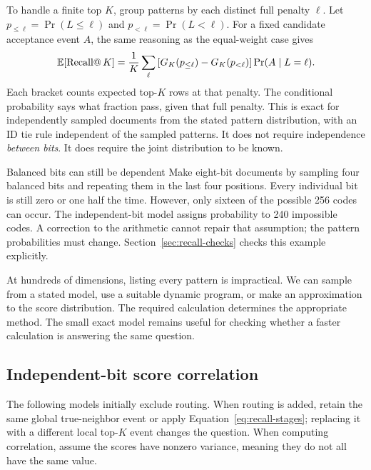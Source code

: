 To handle a finite top $K$, group patterns by each distinct full penalty $\ell$. Let
$p_{\le\ell}=\Pr(L\le\ell)$ and $p_{<\ell}=\Pr(L<\ell)$. For a fixed candidate acceptance event
$A$, the same reasoning as the equal-weight case gives
\begin{equation}
\mathbb E[\operatorname{Recall@}K]
=\frac1K\sum_{\ell}
 \left[G_K(p_{\le\ell})-G_K(p_{<\ell})\right]\Pr(A\mid L=\ell).
\label{eq:weighted-finite-recall}
\end{equation}
Each bracket counts expected top-$K$ rows at that penalty. The conditional probability says
what fraction pass, given that full penalty. This is exact for independently sampled documents from the stated pattern
distribution, with an ID tie rule independent of the sampled patterns. It does not require
independence \emph{between bits}. It does require the joint distribution to be known.

\begin{examplebox}{Balanced bits can still be dependent}
Make eight-bit documents by sampling four balanced bits and repeating them in the last four
positions. Every individual bit is still zero or one half the time. However, only sixteen
of the possible 256 codes can occur. The independent-bit model assigns probability to 240
impossible codes. A correction to the arithmetic cannot repair that assumption; the pattern
probabilities must change. Section~\ref{sec:recall-checks} checks this example explicitly.
\end{examplebox}

At hundreds of dimensions, listing every pattern is impractical. We can sample from a stated
model, use a suitable dynamic program, or make an approximation to the score distribution.
The required calculation determines the appropriate method. The small exact model remains useful for
checking whether a faster calculation is answering the same question.

\subsection{Independent-bit score correlation}
The following models initially exclude routing. When routing is added, retain the same global true-neighbor event or apply Equation~\eqref{eq:recall-stages}; replacing it with a different local top-$K$ event changes the question. When computing correlation, assume the scores have nonzero variance, meaning they do not all have the same value.

